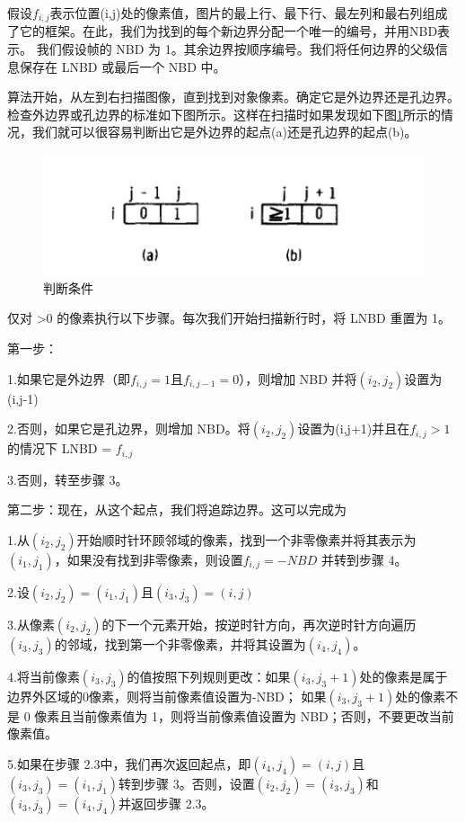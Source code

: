 假设$f_{i,j}$表示位置(i,j)处的像素值，图片的最上行、最下行、最左列和最右列组成了它的框架。在此，我们为找到的每个新边界分配一个唯一的编号，并用NBD表示。
我们假设帧的 NBD 为 1。其余边界按顺序编号。我们将任何边界的父级信息保存在 LNBD 或最后一个 NBD 中。

算法开始，从左到右扫描图像，直到找到对象像素。确定它是外边界还是孔边界。检查外边界或孔边界的标准如下图所示。这样在扫描时如果发现如下图\ref{18}所示的情况，我们就可以很容易判断出它是外边界的起点(a)还是孔边界的起点(b)。
\begin{figure}[ht]
    \centering
    \includegraphics[width=\textwidth]{figures/algorithm_condition.png}
    \caption{判断条件}
    \label{18}
\end{figure}


仅对 >0 的像素执行以下步骤。每次我们开始扫描新行时，将 LNBD 重置为 1。

第一步：

1.如果它是外边界（即$f_{i,j}=1$且$f_{i,j-1}=0$），则增加 NBD 并将$(i_2,j_2)$设置为(i,j-1)

2.否则，如果它是孔边界，则增加 NBD。将$(i_2,j_2)$设置为(i,j+1)并且在$f_{i,j}>1$的情况下 LNBD = $f_{i,j}$

3.否则，转至步骤 3。

第二步：现在，从这个起点，我们将追踪边界。这可以完成为

1.从$(i_2,j_2)$开始顺时针环顾邻域的像素，找到一个非零像素并将其表示为$(i_1,j_1)$，如果没有找到非零像素，则设置$f_{i,j}=-NBD$ 并转到步骤 4。

2.设$(i_2,j_2)=(i_1,j_1)$且$(i_3,j_3)=(i,j)$

3.从像素$(i_2,j_2)$的下一个元素开始，按逆时针方向，再次逆时针方向遍历$(i_3,j_3)$的邻域，找到第一个非零像素，并将其设置为$(i_4,j_4)$。

4.将当前像素$(i_3,j_3)$的值按照下列规则更改：如果$(i_3,j_3+1)$处的像素是属于边界外区域的0像素，则将当前像素值设置为-NBD；
如果$(i_3,j_3+1)$处的像素不是 0 像素且当前像素值为 1，则将当前像素值设置为 NBD；否则，不要更改当前像素值。

5.如果在步骤 2.3中，我们再次返回起点，即$(i_4,j_4)=(i,j)$且$(i_3,j_3)=(i_1,j_1)$转到步骤 3。否则，设置$(i_2,j_2)=(i_3,j_3)$和$(i_3,j_3)=(i_4,j_4)$并返回步骤 2.3。

